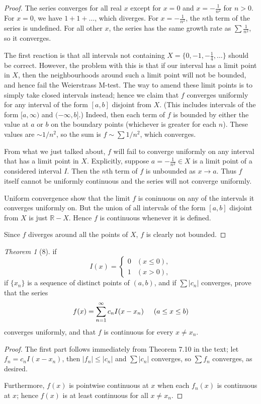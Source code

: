 \documentclass[12pt]{article}
\theoremstyle{remark}
\theoremstyle{named}
\newtheorem*{theorem}{Theorem}
\newcommand{\R}{\mathbb R}
\newcommand{\abs}[1]{|#1|}
\begin{document}
\begin{proof}
    The series converges for all real \(x\) except for \(x = 0\) and \(x = -\frac{1}{n^2}\) for \(n > 0\). For \(x = 0\), we have \(1 + 1 + \dots\), which diverges. For \(x = -\frac{1}{n^2}\), the \(n\)th term of the series is undefined. For all other \(x\), the series has the same growth rate as \(\sum \frac{1}{n^2}\), so it converges. 

    The first reaction is that all intervals not containing \(X = \{0, -1, -\frac{1}{4}, \dots\}\) should be correct. However, the problem with this is that if our interval has a limit point in \(X\), then the neighbourhoods around such a limit point will not be bounded, and hence fail the Weierstrass M-test. 
    The way to amend these limit points is to simply take closed intervals instead; hence we claim that \(f\) converges uniformly for any interval of the form \([a, b]\) disjoint from \(X\). (This includes intervals of the form \([a, \infty)\) and \((-\infty, b]\).) 
    Indeed, then each term of \(f\) is bounded by either the value at \(a\) or \(b\) on the boundary points (whichever is greater for each \(n\)). These values are \(\sim 1/n^2\),  so the sum is \(f \sim \sum 1/n^2\), which converges. 

    From what we just talked about, \(f\) will fail to converge uniformly on any interval that has a limit point in \(X\). Explicitly, suppose \(a = -\frac{1}{n^2} \in X\) is a limit point of a considered interval \(I\). Then the \(n\)th term of \(f\) is unbounded as \(x \to a\). Thus \(f\) itself cannot be uniformly continuous and the series will not converge uniformly.

    Uniform convergence show that the limit \(f\) is coninuous on any of the intervals it converges uniformly on. But the union of all intervals of the form \([a, b]\) disjoint from \(X\) is just \(\R - X\). Hence \(f\) is continuous whenever it is defined. 

    Since \(f\) diverges around all the points of \(X\), \(f\) is clearly not bounded. 
\end{proof}

\begin{theorem}[8]
    if \[I(x) = \begin{cases}
        0 & (x \le 0), \\
        1 & (x > 0),
    \end{cases}\]
    if \(\{x_n\}\) is a sequence of distinct points of \((a, b)\), and if \(\sum \abs{c_n}\) converges, prove that the series \[f(x) = \sum_{n = 1}^\infty c_n I(x - x_n) \hspace*{5mm} (a \le x \le b)\] converges uniformly, and that \(f\) is continuous for every \(x \neq x_n\).
\end{theorem}

\begin{proof}
    The first part follows immediately from Theorem 7.10 in the text; let \(f_n = c_n I(x - x_n)\), then \(|f_n| \le \abs{c_n}\) and \(\sum \abs{c_n}\) converges, so \(\sum f_n\) converges, as desired.

    Furthermore, \(f(x)\) is pointwise continuous at \(x\) when each \(f_n(x)\) is continuous at \(x\); hence \(f(x)\) is at least continuous for all \(x \neq x_n\).
\end{proof}
\end{document}
